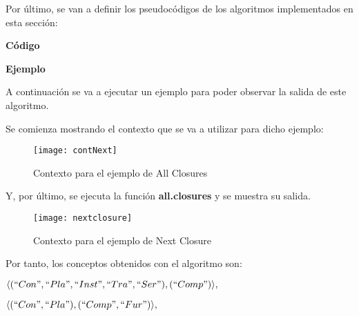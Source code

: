         \bigskip

        Por \'ultimo, se van a definir los pseudoc\'odigos de los algoritmos implementados en esta secci\'on: 

        \bigskip

        
    
        \bigskip

        
    
        \bigskip

        
    
        \clearpage


    
        \textbf{C\'odigo}

        

        \bigskip

        
    
        \bigskip
    
        \textbf{Ejemplo}

        A continuaci\'on se va a ejecutar un ejemplo para poder observar la salida de este algoritmo.

        Se comienza mostrando el contexto que se va a utilizar para dicho ejemplo:

        \begin{figure}[H]
            \centering
            \texttt{[image: contNext]}
            \caption{Contexto para el ejemplo de All Closures}
            \label{fig:contNext}
        \end{figure}

        \clearpage

        Y, por \'ultimo, se ejecuta la funci\'on \textbf{all.closures} y se muestra su salida.
        
        \begin{figure}[H]
            \centering
            \texttt{[image: nextclosure]}
            \caption{Contexto para el ejemplo de Next Closure}
            \label{fig:nextclosure}
        \end{figure}

        Por tanto, los conceptos obtenidos con el algoritmo son:

        \( \langle (``Con", ``Pla", ``Inst", ``Tra", ``Ser"), (``Comp") \rangle ,\)

        \(\langle (``Con", ``Pla"), (``Comp", ``Fur") \rangle ,\)

